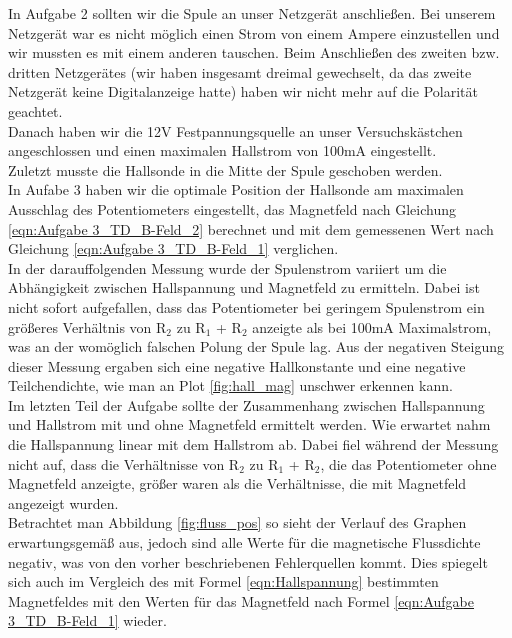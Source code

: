 \documentclass[12pt]{scrartcl}
\begin{document}
In Aufgabe 2 sollten wir die Spule an unser Netzgerät anschließen. Bei unserem Netzgerät war es nicht möglich einen Strom von einem Ampere einzustellen und wir mussten es mit einem anderen tauschen. Beim Anschließen des zweiten bzw. dritten Netzgerätes (wir haben insgesamt dreimal gewechselt, da das zweite Netzgerät keine Digitalanzeige hatte) haben wir nicht mehr auf die Polarität geachtet.\\
Danach haben wir die 12V Festpannungsquelle an unser Versuchskästchen angeschlossen und einen maximalen Hallstrom von 100mA eingestellt.\\
Zuletzt musste die Hallsonde in die Mitte der Spule geschoben werden.\\
In Aufabe 3 haben wir die optimale Position der Hallsonde am maximalen Ausschlag des Potentiometers eingestellt, das Magnetfeld nach Gleichung \ref{eqn:Aufgabe 3_TD_B-Feld_2} berechnet und mit dem gemessenen Wert nach Gleichung \ref{eqn:Aufgabe 3_TD_B-Feld_1} verglichen.\\
In der darauffolgenden Messung wurde der Spulenstrom variiert um die Abhängigkeit zwischen Hallspannung und Magnetfeld zu ermitteln. Dabei ist nicht sofort aufgefallen, dass das Potentiometer bei geringem Spulenstrom ein größeres Verhältnis von R$_2$ zu R$_1$ + R$_2$ anzeigte als bei 100mA Maximalstrom, was an der womöglich falschen Polung der Spule lag. Aus der negativen Steigung dieser Messung ergaben sich eine negative Hallkonstante und eine negative Teilchendichte, wie man an Plot \ref{fig:hall_mag}
unschwer erkennen kann.\\
Im letzten Teil der Aufgabe sollte der Zusammenhang zwischen Hallspannung und Hallstrom mit und ohne Magnetfeld ermittelt werden. Wie erwartet nahm die Hallspannung linear mit dem Hallstrom ab. Dabei fiel während der Messung nicht auf, dass die Verhältnisse von R$_2$ zu R$_1$ + R$_2$, die das Potentiometer ohne Magnetfeld anzeigte, größer waren als die Verhältnisse, die mit Magnetfeld angezeigt wurden.\\
Betrachtet man Abbildung \ref{fig:fluss_pos} so sieht der Verlauf des Graphen erwartungsgemäß aus, jedoch sind alle Werte für die magnetische Flussdichte negativ, was von den vorher beschriebenen Fehlerquellen kommt. Dies spiegelt sich auch im Vergleich des mit Formel \ref{eqn:Hallspannung} bestimmten Magnetfeldes mit den Werten für das Magnetfeld nach Formel \ref{eqn:Aufgabe 3_TD_B-Feld_1} wieder.\\
\end{document}

